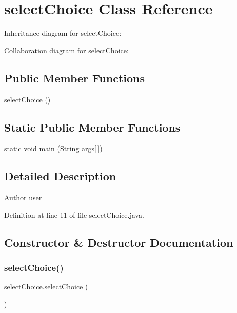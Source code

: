 \hypertarget{classselect_choice}{}\section{select\+Choice Class Reference}
\label{classselect_choice}


Inheritance diagram for select\+Choice\+:


Collaboration diagram for select\+Choice\+:
\subsection*{Public Member Functions}
\begin{DoxyCompactItemize}
\item 
\mbox{\hyperlink{classselect_choice_a8bd1a1f06f82203ba0c8b51a8d741c34}{select\+Choice}} ()
\end{DoxyCompactItemize}
\subsection*{Static Public Member Functions}
\begin{DoxyCompactItemize}
\item 
static void \mbox{\hyperlink{classselect_choice_a6c7bc3bed977cd4ced7f2cc59e2b3be1}{main}} (String args\mbox{[}$\,$\mbox{]})
\end{DoxyCompactItemize}


\subsection{Detailed Description}
\begin{DoxyAuthor}{Author}
user 
\end{DoxyAuthor}


Definition at line 11 of file select\+Choice.\+java.



\subsection{Constructor \& Destructor Documentation}
\mbox{\label{classselect_choice_a8bd1a1f06f82203ba0c8b51a8d741c34}} 
\subsubsection{\texorpdfstring{select\+Choice()}{selectChoice()}}
{\footnotesize\ttfamily select\+Choice.\+select\+Choice (\begin{DoxyParamCaption}{ }\end{DoxyParamCaption})}

